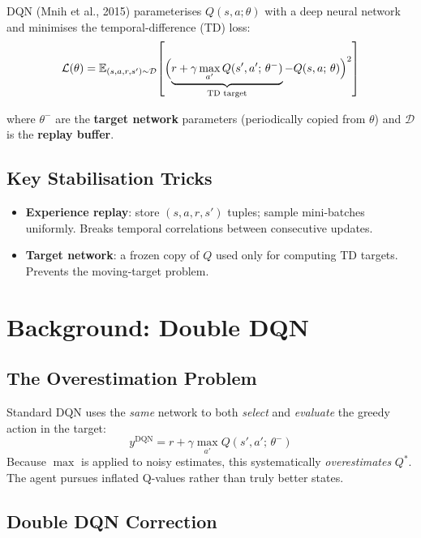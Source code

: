 \documentclass[12pt]{article}
\begin{document}
DQN (Mnih et al., 2015) parameterises $Q(s,a;\theta)$ with a deep neural network and
minimises the temporal-difference (TD) loss:
\begin{equation}
  \mathcal{L}(\theta) =
  \mathbb{E}_{(s,a,r,s') \sim \mathcal{D}}\!\left[
    \Bigl(
      \underbrace{r + \gamma \max_{a'} Q(s', a';\,\theta^-)}_{\text{TD target}}
      - Q(s,a;\,\theta)
    \Bigr)^2
  \right]
\end{equation}

where $\theta^-$ are the \textbf{target network} parameters (periodically copied from $\theta$)
and $\mathcal{D}$ is the \textbf{replay buffer}.

\subsection{Key Stabilisation Tricks}
\begin{itemize}
  \item \textbf{Experience replay}: store $(s,a,r,s')$ tuples; sample mini-batches uniformly.
        Breaks temporal correlations between consecutive updates.
  \item \textbf{Target network}: a frozen copy of $Q$ used only for computing TD targets.
        Prevents the moving-target problem.
\end{itemize}

\section{Background: Double DQN}

\subsection{The Overestimation Problem}

Standard DQN uses the \emph{same} network to both \emph{select} and \emph{evaluate} the
greedy action in the target:
\[
  y^{\text{DQN}} = r + \gamma \max_{a'} Q(s', a';\,\theta^-)
\]
Because $\max$ is applied to noisy estimates, this systematically \emph{overestimates}
$Q^*$. The agent pursues inflated Q-values rather than truly better states.

\subsection{Double DQN Correction}
\end{document}
